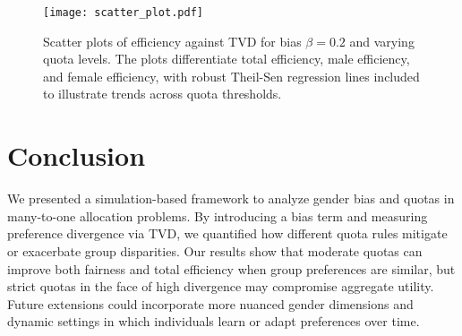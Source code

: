 \documentclass[letterpaper]{article}
\begin{document}
\begin{figure}[ht]

  \centering
  \texttt{[image: scatter\_plot.pdf]}
\caption{Scatter plots of efficiency against TVD for bias \( \beta = 0.2 \) and varying quota levels. The plots differentiate total efficiency, male efficiency, and female efficiency, with robust Theil-Sen regression lines included to illustrate trends across quota thresholds.}

  \label{fig:scatter_plot}
\end{figure}







\section{Conclusion}
We presented a simulation-based framework to analyze gender bias and quotas in many-to-one allocation problems. By introducing a bias term and measuring preference divergence via TVD, we quantified how different quota rules mitigate or exacerbate group disparities. Our results show that moderate quotas can improve both fairness and total efficiency when group preferences are similar, but strict quotas in the face of high divergence may compromise aggregate utility. Future extensions could incorporate more nuanced gender dimensions and dynamic settings in which individuals learn or adapt preferences over time.

\bigskip


\end{document}

